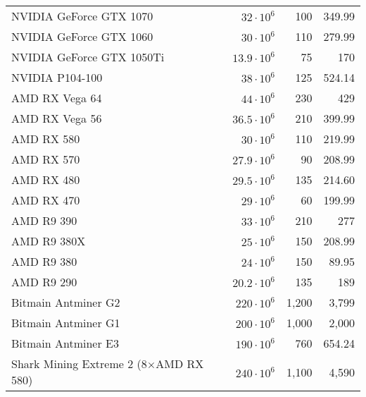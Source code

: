 \begin{longtable}{|p{}|r|r|r|}
  NVIDIA GeForce GTX 1070                                             & $ 32 \cdot 10^6$ & 100 & 349.99 \\
  NVIDIA GeForce GTX 1060                                             & $ 30 \cdot 10^6$ & 110 & 279.99 \\
  NVIDIA GeForce GTX 1050Ti                                           & $ 13.9 \cdot 10^6$ & 75 & 170 \\
  NVIDIA P104-100                                                     & $ 38 \cdot 10^6$ & 125 & 524.14 \\
  AMD RX Vega 64                                                      & $ 44 \cdot 10^6$ & 230 & 429 \\
  AMD RX Vega 56                                                      & $ 36.5 \cdot 10^6$ & 210 & 399.99 \\
  AMD RX 580                                                          & $ 30 \cdot 10^6$ & 110 & 219.99 \\
  AMD RX 570                                                          & $ 27.9 \cdot 10^6$ & 90 & 208.99 \\
  AMD RX 480                                                          & $ 29.5 \cdot 10^6$ & 135 & 214.60 \\
  AMD RX 470                                                          & $ 29 \cdot 10^6$ & 60 & 199.99 \\
  AMD R9 390                                                          & $ 33 \cdot 10^6$ & 210 & 277 \\
  AMD R9 380X                                                         & $ 25 \cdot 10^6$ & 150 & 208.99 \\
  AMD R9 380                                                          & $ 24 \cdot 10^6$ & 150 & 89.95 \\
  AMD R9 290                                                          & $ 20.2 \cdot 10^6$ & 135 & 189 \\
  Bitmain Antminer G2                                                 & $220 \cdot 10^6$ & 1,200 & 3,799 \\
  Bitmain Antminer G1                                                 & $200 \cdot 10^6$ & 1,000 & 2,000 \\
  Bitmain Antminer E3                                                 & $190 \cdot 10^6$ & 760 & 654.24 \\
  Shark Mining Extreme 2 (8$\times$AMD RX 580)                & $240 \cdot 10^6$ & 1,100 & 4,590 \\

\end{longtable}
